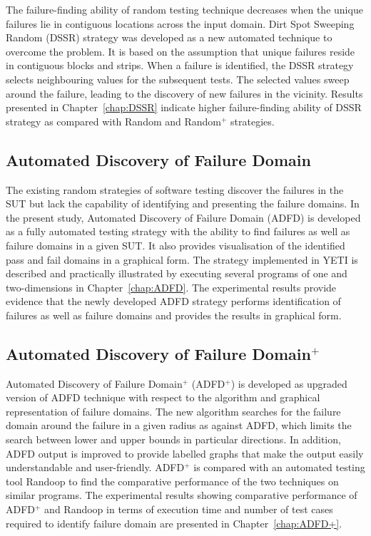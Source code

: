 The failure-finding ability of random testing technique decreases when the unique failures lie in contiguous locations across the input domain. Dirt Spot Sweeping Random (DSSR) strategy was developed as a new automated technique to overcome the problem. It is based on the assumption that unique failures reside in contiguous blocks and strips. When a failure is identified, the DSSR strategy selects neighbouring values for the subsequent tests. The selected values sweep around the failure, leading to the discovery of new failures in the vicinity. Results presented in Chapter~\ref{chap:DSSR} indicate higher failure-finding ability of DSSR strategy as compared with Random and Random$^+$ strategies.

\subsection{Automated Discovery of Failure Domain}
The existing random strategies of software testing discover the failures in the SUT but lack the capability of identifying and presenting the failure domains. In the present study, Automated Discovery of Failure Domain (ADFD) is developed as a fully automated testing strategy with the ability to find failures as well as failure domains in a given SUT. It also provides visualisation of the identified pass and fail domains in a graphical form. The strategy implemented in YETI is described and practically illustrated by executing several programs of one and two-dimensions in Chapter~\ref{chap:ADFD}. The experimental results provide evidence that the newly developed ADFD strategy performs identification of failures as well as failure domains and provides the results in graphical form.

\subsection{Automated Discovery of Failure Domain$^+$}
Automated Discovery of Failure Domain$^+$ (ADFD$^+$) is developed as upgraded version of ADFD technique with respect to the algorithm and graphical representation of failure domains. The new algorithm searches for the failure domain around the failure in a given radius as against ADFD, which limits the search between lower and upper bounds in particular directions. In addition, ADFD output is improved to provide labelled graphs that make the output easily understandable and user-friendly. ADFD$^+$ is compared with an automated testing tool Randoop to find the comparative performance of the two techniques on similar programs. 
The experimental results showing comparative performance of ADFD$^+$ and Randoop in terms of execution time and number of test cases required to identify failure domain are presented in Chapter~\ref{chap:ADFD+}.

